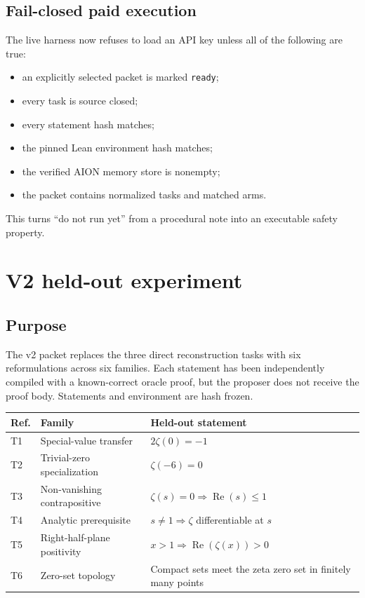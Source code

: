 \documentclass[11pt,a4paper]{article}
\newcommand{\code}[1]{\texttt{#1}}
\newcommand{\RePart}{\operatorname{Re}}
\begin{document}
\subsection{Fail-closed paid execution}

The live harness now refuses to load an API key unless all of the following are
true:

\begin{itemize}
  \item an explicitly selected packet is marked \code{ready};
  \item every task is source closed;
  \item every statement hash matches;
  \item the pinned Lean environment hash matches;
  \item the verified AION memory store is nonempty;
  \item the packet contains normalized tasks and matched arms.
\end{itemize}

This turns ``do not run yet'' from a procedural note into an executable safety
property.

\section{V2 held-out experiment}

\subsection{Purpose}

The v2 packet replaces the three direct reconstruction tasks with six
reformulations across six families. Each statement has been independently
compiled with a known-correct oracle proof, but the proposer does not receive
the proof body. Statements and environment are hash frozen.

\begin{longtable}{@{}p{10mm}p{48mm}p{91mm}@{}}
\toprule
Ref. & Family & Held-out statement \\
\midrule
\endhead
T1 & Special-value transfer & $2\zeta(0)=-1$ \\
T2 & Trivial-zero specialization & $\zeta(-6)=0$ \\
T3 & Non-vanishing contrapositive & $\zeta(s)=0\Rightarrow\RePart(s)\leq1$ \\
T4 & Analytic prerequisite & $s\neq1\Rightarrow\zeta$ differentiable at $s$ \\
T5 & Right-half-plane positivity & $x>1\Rightarrow\RePart(\zeta(x))>0$ \\
T6 & Zero-set topology & Compact sets meet the zeta zero set in finitely many points \\
\bottomrule
\end{longtable}
\end{document}
